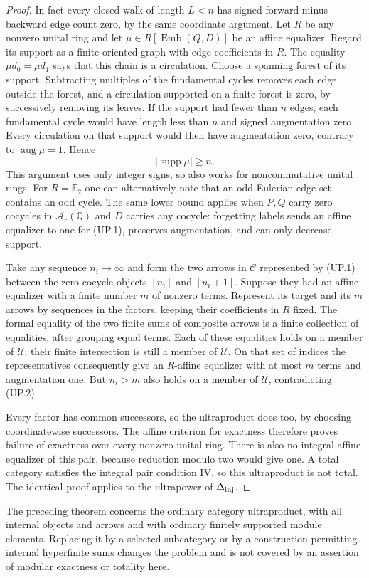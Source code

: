 \begin{proof}
In fact every closed walk of length $L<n$ has signed forward
minus backward edge count zero, by the same coordinate argument.
Let $R$ be any nonzero unital ring and let
$\mu\in R[\operatorname{Emb}(Q,D)]$ be an affine equalizer.
Regard its support as a finite oriented graph with edge coefficients
in $R$. The equality $\mu d_0=\mu d_1$ says that this chain is a
circulation. Choose a spanning forest of its support. Subtracting
multiples of the fundamental cycles removes each edge outside the
forest, and a circulation supported on a finite forest is zero,
by successively removing its leaves. If the support had fewer
than $n$ edges, each fundamental cycle would have length less
than $n$ and signed augmentation zero. Every circulation on that
support would then have augmentation zero, contrary to
$\operatorname{aug}\mu=1$. Hence
\[
 |\operatorname{supp}\mu|\geq n.
 \tag{UP.2}\label{C4:window-support}
\]
This argument uses only integer signs, so also works for
noncommutative unital rings. For $R=\mathbb F_2$ one can
alternatively note that an odd Eulerian edge set contains an odd
cycle. The same lower bound applies when $P,Q$ carry zero
cocycles in $\mathcal A_r(\mathbb Q)$ and $D$ carries any
cocycle: forgetting labels sends an affine equalizer to one for
(UP.1), preserves augmentation, and can only decrease support.

Take any sequence $n_i\to\infty$ and form the two arrows in
$\mathcal C$ represented by (UP.1) between the zero-cocycle
objects $[n_i]$ and $[n_i+1]$. Suppose they had an affine
equalizer with a finite number $m$ of nonzero terms. Represent
its target and its $m$ arrows by sequences in the factors, keeping their coefficients in $R$ fixed. The
formal equality of the two finite sums of composite arrows is
a finite collection of equalities, after grouping equal terms.
Each of these equalities holds on a member of $\mathcal U$;
their finite intersection is still a member of $\mathcal U$.
On that set of indices the representatives consequently give
an $R$-affine equalizer with at most $m$ terms and
augmentation one. But $n_i>m$ also holds on a member of
$\mathcal U$, contradicting (UP.2).

Every factor has common successors, so the ultraproduct does
too, by choosing coordinatewise successors. The affine criterion
for exactness therefore proves failure of exactness over every
nonzero unital ring. There is also no integral affine equalizer of this
pair, because reduction modulo two would give one. A total
category satisfies the integral pair condition IV, so this
ultraproduct is not total. The identical proof applies to the
ultrapower of $\Delta_{\rm inj}$.
\end{proof}

The preceding theorem concerns the ordinary category
ultraproduct, with all internal objects and arrows and with
ordinary finitely supported module elements. Replacing it by
a selected subcategory or by a construction permitting internal
hyperfinite sums changes the problem and is not covered by an
assertion of modular exactness or totality here.
